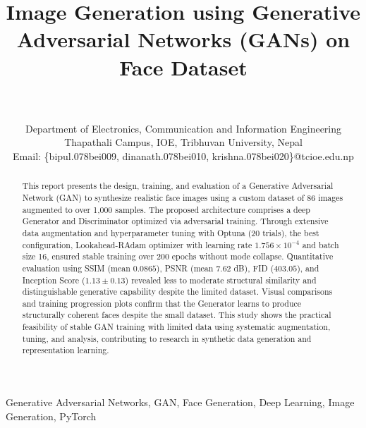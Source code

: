 \documentclass[a4paper, journal]{IEEEtran}
\begin{document}
\title{Image Generation using Generative Adversarial Networks (GANs) on Face Dataset}

\author{
     \\
     \quad \\
    Department of Electronics, Communication and Information Engineering\\
    Thapathali Campus, IOE, Tribhuvan University, Nepal\\
    Email: \{bipul.078bei009, dinanath.078bei010, krishna.078bei020\}@tcioe.edu.np\\

}

\maketitle
\begin{abstract}
    This report presents the design, training, and evaluation of a Generative Adversarial Network (GAN) to synthesize realistic face images using a custom dataset of 86 images augmented to over 1,000 samples. The proposed architecture comprises a deep Generator and Discriminator optimized via adversarial training. Through extensive data augmentation and hyperparameter tuning with Optuna (20 trials), the best configuration, Lookahead-RAdam optimizer with learning rate $1.756 \times 10^{-4}$ and batch size 16, ensured stable training over 200 epochs without mode collapse. Quantitative evaluation using SSIM (mean $0.0865$), PSNR (mean $7.62$ dB), FID ($403.05$), and Inception Score ($1.13 \pm 0.13$) revealed less to moderate structural similarity and distinguishable generative capability despite the limited dataset. Visual comparisons and training progression plots confirm that the Generator learns to produce structurally coherent faces despite the small dataset. This study shows the practical feasibility of stable GAN training with limited data using systematic augmentation, tuning, and analysis, contributing to research in synthetic data generation and representation learning.
\end{abstract}

\begin{IEEEkeywords}
    Generative Adversarial Networks, GAN, Face Generation, Deep Learning, Image Generation, PyTorch
\end{IEEEkeywords}
\end{document}
